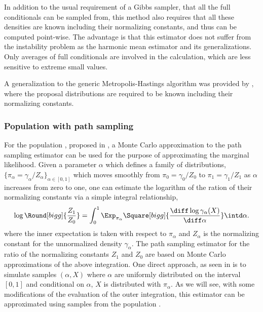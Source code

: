 In addition to the usual requirement of a Gibbs sampler, that all the full
conditionals can be sampled from, this method also requires that all these
densities are known including their normalizing constants, and thus can be
computed point-wise. The advantage is that this estimator does not suffer from
the instability problem as the harmonic mean estimator and its
generalizations. Only averages of full conditionals are involved in the
calculation, which are less sensitive to extreme small values.

A generalization to the generic Metropolis-Hastings algorithm was provided by
\cite{Chib:2001gq}, where the proposal distributions are required to be
known including their normalizing constants.

\subsubsection{Population \mcmc with path sampling}
\label{ssub:Population mcmc with path sampling}

For the population \mcmc, proposed in \cite{Calderhead:2009bd}, a Monte Carlo
approximation to the path sampling estimator \cite{Gelman:1998ei} can be used
for the purpose of approximating the marginal likelihood. Given a parameter
$\alpha$ which defines a family of distributions, $\{\pi_{\alpha} =
\gamma_{\alpha}/Z_{\alpha}\}_{\alpha\in[0,1]}$ which moves smoothly from
$\pi_0 = \gamma_0/Z_0$ to $\pi_1 = \gamma_1/Z_1$ as $\alpha$ increases from
zero to one, one can estimate the logarithm of the ration of their normalizing
constants via a simple integral relationship,
\begin{equation}
  \log\Round[bigg]{\frac{Z_1}{Z_0}} = \int_0^1\Exp_{\pi_{\alpha}}
  \Square[bigg]{\frac{\diff\log\gamma_{\alpha}(X)}{\diff\alpha}}
  \intd\alpha.
  \label{eq:path integral}
\end{equation}
where the inner expectation is taken with respect to $\pi_{\alpha}$ and
$Z_{\alpha}$ is the normalizing constant for the unnormalized density
$\gamma_{\alpha}$. The path sampling estimator for the ratio of the
normalizing constants $Z_1$ and $Z_0$ are based on Monte Carlo approximations
of the above integration. One direct approach, as seen in \cite{Gelman:1998ei}
is to simulate samples $(\alpha,X)$ where $\alpha$ are uniformly distributed
on the interval $[0,1]$ and conditional on $\alpha$, $X$ is distributed with
$\pi_{\alpha}$. As we will see, with some modifications of the evaluation of
the outer integration, this estimator can be approximated using samples from
the population \mcmc.

